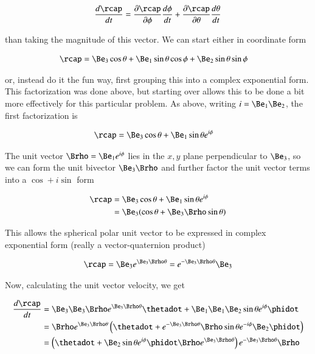\begin{align}\label{eqn:sphericalPolarUnit:yoo1a}
\frac{d\rcap}{dt} = \PD{\phi}{\rcap} \frac{d\phi}{dt} 
+\PD{\theta}{\rcap} \frac{d\theta}{dt}
\end{align}

than taking the magnitude of this vector.  We can start either in coordinate form

\begin{align}\label{eqn:sphericalPolarUnit:yoo1}
\rcap 
&= \Be_3 \cos\theta + \Be_1 \sin\theta \cos\phi + \Be_2 \sin\theta \sin\phi
\end{align}

or, instead do it the fun way, first grouping this into a complex exponential form.  This factorization was done above, but starting over allows this to be done a bit more effectively for this particular problem.  As above, writing $i = \Be_1 \Be_2$, the first factorization is

\begin{align}\label{eqn:sphericalPolarUnit:yoo2}
\rcap 
&= \Be_3 \cos\theta + \Be_1 \sin\theta e^{i\phi} 
\end{align}

The unit vector $\Brho = \Be_1 e^{i\phi}$ lies in the $x,y$ plane perpendicular to $\Be_3$, so we can form the unit bivector $\Be_3\Brho$ and further factor the unit vector terms into a $\cos + i \sin$ form

\begin{align*}
\rcap 
&= \Be_3 \cos\theta + \Be_1 \sin\theta e^{i\phi} \\
&= \Be_3 (\cos\theta + \Be_3 \Brho \sin\theta) \\
\end{align*}

This allows the spherical polar unit vector to be expressed in complex exponential form (really a vector-quaternion product)

\begin{align}\label{eqn:sphericalPolarUnit:yoo3}
\rcap = \Be_3 e^{\Be_3 \Brho \theta} = e^{-\Be_3 \Brho \theta} \Be_3
\end{align}

Now, calculating the unit vector velocity, we get

\begin{align*}
\frac{d\rcap}{dt} 
&= \Be_3 \Be_3 \Brho e^{\Be_3 \Brho \theta} \thetadot + \Be_1 \Be_1 \Be_2 \sin\theta e^{i\phi} \phidot \\
&= \Brho e^{\Be_3 \Brho \theta} \left(\thetadot + e^{-\Be_3 \Brho \theta} \Brho \sin\theta e^{-i\phi} \Be_2 \phidot\right) \\
&= \left( \thetadot + \Be_2 \sin\theta e^{i\phi} \phidot \Brho e^{\Be_3 \Brho \theta} \right) e^{-\Be_3 \Brho \theta} \Brho
\end{align*}

